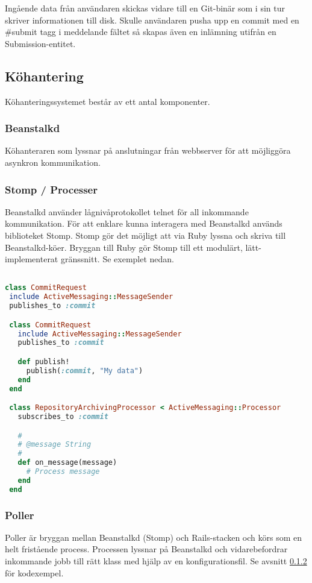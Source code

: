 Ingående data från användaren skickas vidare till en Git-binär som i sin tur skriver informationen till disk. Skulle användaren pusha upp en commit med en \#submit tagg i meddelande fältet så skapas även en inlämning utifrån en Submission-entitet.
\subsection{Köhantering}
Köhanteringssystemet består av ett antal komponenter.

\subsubsection{Beanstalkd}

Köhanteraren som lyssnar på anslutningar från webbserver för att möjliggöra asynkron kommunikation.

\subsubsection{Stomp / Processer}
\label{subsub:stomp}

Beanstalkd använder lågnivåprotokollet telnet för all inkommande kommunikation. För att enklare kunna interagera med Beanstalkd används biblioteket Stomp. Stomp gör det möjligt att via Ruby lyssna och skriva till Beanstalkd-köer. Bryggan till Ruby gör Stomp till ett modulärt, lätt-implementerat gränssnitt. Se exemplet nedan.

\begin{lstlisting}[language=Ruby, showstringspaces=false]

class CommitRequest
 include ActiveMessaging::MessageSender
 publishes_to :commit

 class CommitRequest
   include ActiveMessaging::MessageSender
   publishes_to :commit

   def publish!
     publish(:commit, "My data")
   end
 end

 class RepositoryArchivingProcessor < ActiveMessaging::Processor
   subscribes_to :commit

   #
   # @message String
   #
   def on_message(message)
     # Process message
   end
 end
\end{lstlisting}

\subsubsection{Poller}

Poller är bryggan mellan Beanstalkd (Stomp) och Rails-stacken och körs som en helt fristående process. Processen lyssnar på Beanstalkd och vidarebefordrar inkommande jobb till rätt klass med hjälp av en konfigurationsfil. Se avsnitt \ref{subsub:stomp} för kodexempel.


